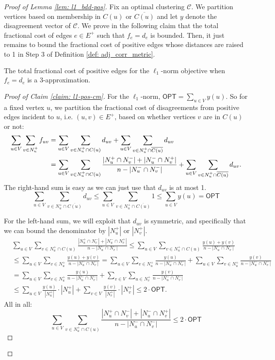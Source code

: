 \begin{proof}[Proof of Lemma \ref{lem: l1_bdd-pos}]


Fix an optimal clustering $\mathcal{C}$. 
We partition vertices based on membership in $C(u)$ or $\overline{C(u)}$ and let $y$ denote the disagreement vector of $\mathcal{C}$. 
We prove in 
the following claim that the total fractional cost of edges $e \in E^+$ such that $f_e = d_e$ is bounded.  
Then, it just remains to bound the fractional cost of positive edges whose distances are raised to 1 in Step 3 of Definition \ref{def: adj_corr_metric}.
\begin{claim}\label{claim: l1-pos-cm}
The total fractional cost of positive edges for the $\ell_1$-norm objective when
$f_e = d_e$ is a $3$-approximation. 
\end{claim}
\begin{proof}[Proof of Claim \ref{claim: l1-pos-cm}]
For the $\ell_1$-norm, $\textsf{OPT} = \sum_{u \in V} y(u)$.
So for a fixed vertex $u$,
we partition the fractional cost of disagreements from positive edges incident to $u$, i.e. $(u,v) \in E^+$, based on whether vertices $v$ are in $C(u)$ or not:
\begin{align*}
    \sum_{u \in V} \sum_{v \in N_u^+} f_{uv}
    &=  \sum_{u \in V}\sum_{v \in N_u^+ \cap C(u)} d_{uv}+ \sum_{u \in V}\sum_{v \in N_u^+ \cap \overline{C(u)}} d_{uv} \\
    &= \sum_{u \in V}\sum_{v \in N_u^+ \cap C(u)} \frac{|N_u^+ \cap N_v^-| + |N_u^- \cap N_v^+|}{n-|N_u^- \cap N_v^-|} + \sum_{u \in V}\sum_{v \in N_u^+ \cap \overline{C(u)}} d_{uv}. \notag 
\end{align*}
The right-hand sum is easy as we can just use that $d_{uv}$ is at most 1. 
$$\boxed{\sum_{u \in V}\sum_{v \in N_u^+ \cap \overline{C(u)}} d_{uv} \leq \sum_{u \in V}\sum_{v \in N_u^+ \cap \overline{C(u)}} 1 \leq \sum_{u \in V} y(u) = \textsf{OPT}}
$$

For the left-hand sum, we will exploit that $d_{uv}$ is symmetric, and specifically that we can bound the denominator by $|N_u^+|$ or $|N_v^+|$.  
\begin{align*}
    &\sum_{u \in V}\sum_{v \in N_u^+ \cap C(u)} \frac{|N_u^+ \cap N_v^-| + |N_u^- \cap N_v^+|}{n-|N_u^- \cap N_v^-|}
    \leq \sum_{u \in V} \sum_{v \in N_u^+ \cap C(u)}\frac{y(u) + y(v)}{n-|N_u^- \cap N_v^-|}\\
    &\leq \sum_{u \in V} \sum_{v \in N_u^+} \frac{y(u) + y(v)}{n-|N_u^- \cap N_v^-|} 
    = \sum_{u \in V} \sum_{v \in N_u^+} \frac{y(u)}{n-|N_u^- \cap N_v^-|} + \sum_{u \in V} \sum_{v \in N_u^+} \frac{y(v)}{n-|N_u^- \cap N_v^-|}\\
    &= \sum_{u \in V} \sum_{v \in N_u^+} \frac{y(u)}{n-|N_u^- \cap N_v^-|} + \sum_{v \in V} \sum_{u \in N_v^+} \frac{y(v)}{n-|N_u^- \cap N_v^-|} \\
    &\leq \sum_{u \in V} \frac{y(u)}{|N_u^+|} \cdot |N_u^+| + \sum_{v \in V} \frac{y(v)}{|N_v^+|} \cdot |N_v^+| \leq 2\cdot \textsf{OPT}.
\end{align*}
All in all:
$$
    \boxed{\sum_{u \in V}\sum_{v \in N_u^+ \cap C(u)} \frac{|N_u^+ \cap N_v^-| + |N_u^- \cap N_v^+|}{n-|N_u^- \cap N_v^-|}
    \leq 2\cdot \textsf{OPT}}
$$
\end{proof}



\end{proof}

